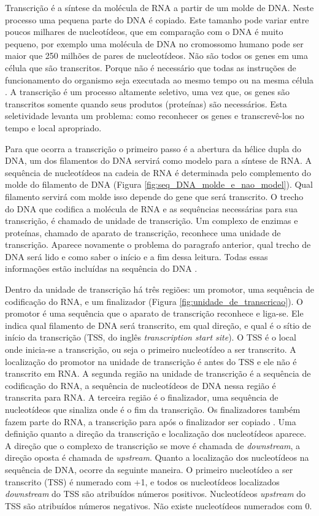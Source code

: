 Transcrição é a síntese da molécula de RNA a partir de um molde de DNA. Neste processo uma pequena parte do DNA é copiado. Este tamanho pode variar entre poucos milhares de nucleotídeos, que em comparação com o DNA é muito pequeno, por exemplo uma molécula de DNA no cromossomo humano pode ser maior que 250 milhões de pares de nucleotídeos. Não são todos os genes em uma célula que são transcritos. Porque não é necessário que todas as instruções de funcionamento do organismo seja executada ao mesmo tempo ou na mesma célula \cite{Pierce2012}. A transcrição é um processo altamente seletivo, uma vez que, os genes são transcritos somente quando seus produtos (proteínas) são necessários. Esta seletividade levanta um problema: como reconhecer os genes e transcrevê-los no tempo e local apropriado. 

Para que ocorra a transcrição o primeiro passo é a abertura da hélice dupla do DNA, um dos filamentos do DNA servirá como modelo para a síntese de RNA. A sequência de nucleotídeos na cadeia de RNA é determinada pelo complemento do molde do filamento de DNA (Figura \ref{fig:seq_DNA_molde_e_nao_model}). Qual filamento servirá com molde isso depende do gene que será transcrito. O trecho do DNA que codifica a molécula de RNA e as sequências necessárias para sua transcrição, é chamado de unidade de transcrição. Um complexo de enzimas e proteínas, chamado de aparato de transcrição, reconhece uma unidade de transcrição. Aparece novamente o problema do paragrafo anterior, qual trecho de DNA será lido e como saber o início e a fim dessa leitura. Todas essas informações estão incluídas na sequência do DNA \cite{Pierce2012}. 

Dentro da unidade de transcrição há três regiões: um promotor, uma sequência de codificação do RNA, e um finalizador (Figura \ref{fig:unidade_de_transcricao}). O promotor é uma sequência que o aparato de transcrição reconhece e liga-se. Ele indica qual filamento de DNA será transcrito, em qual direção, e qual é o sítio de início da transcrição (TSS, do inglês \textit{transcription start site}). O TSS é o local onde inicia-se a transcrição, ou seja o primeiro nucleotídeo a ser transcrito. A localização do promotor na unidade de transcrição é antes do TSS e ele não é transcrito em RNA. A segunda região na unidade de transcrição é a sequência de codificação do RNA, a sequência de nucleotídeos de DNA nessa região é transcrita para RNA. A terceira região é o finalizador, uma sequência de nucleotídeos que sinaliza onde é o fim da transcrição. Os finalizadores também fazem parte do RNA, a transcrição para após o finalizador ser copiado \cite{Pierce2012}. Uma definição quanto a direção da transcrição e localização dos nucleotídeos aparece. A direção que o complexo de transcrição se move é chamada de \textit{downstream}, a direção oposta é chamada de \textit{upstream}. Quanto a localização dos nucleotídeos na sequência de DNA, ocorre da seguinte maneira. O primeiro nucleotídeo a ser transcrito (TSS) é numerado com +1, e todos os nucleotídeos localizados \textit{downstream} do TSS são atribuídos números positivos. Nucleotídeos \textit{upstream} do TSS são atribuídos números negativos. Não existe nucleotídeos numerados com 0.


